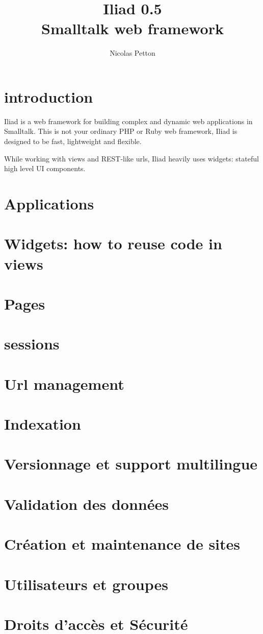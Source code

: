 \documentclass[a4paper,10pt]{report}
\title{\Huge\bf\sffamily Iliad 0.5\\\Large Smalltalk web framework}
\author{Nicolas Petton}
\begin{document}
\sloppy
\maketitle

\tableofcontents



\chapter*{introduction}

Iliad is a web framework for building complex and dynamic web applications in Smalltalk.
This is not your ordinary PHP or Ruby web framework, Iliad is designed to be fast, lightweight and flexible.
\bigskip

While working with views and REST-like urls, Iliad heavily uses widgets: stateful high level UI components.



\chapter{Applications}





\chapter{Widgets: how to reuse code in views}
\chapter{Pages}
\chapter{sessions}
\chapter{Url management}  %
\chapter{Indexation}
\chapter{Versionnage et support multilingue}
\chapter{Validation des données}

\chapter{Création et maintenance de sites}
\chapter{Utilisateurs et groupes}
\chapter{Droits d'accès et Sécurité} %

\printindex
\end{document}
